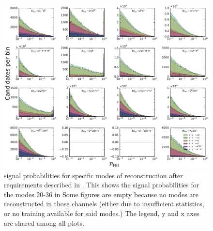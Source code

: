 \begin{figure}[htbp!]

    \includegraphics[width=1\textwidth]{figures/appendices/FEI_signal_probabilities/Bp_feiSigProbs2.pdf}

    \caption{\label{fig:feisigprobs2} \FEI signal probabilities for specific modes of \Bp reconstruction after requirements described in .
    This shows the signal probabilities for the modes 20-36 in 
    Some figures are empty because no modes are reconstructed in those channels (either due to insufficient statistics, or no training available for said modes.)
    The legend, y and x axes are shared among all plots.
    }
\end{figure}

